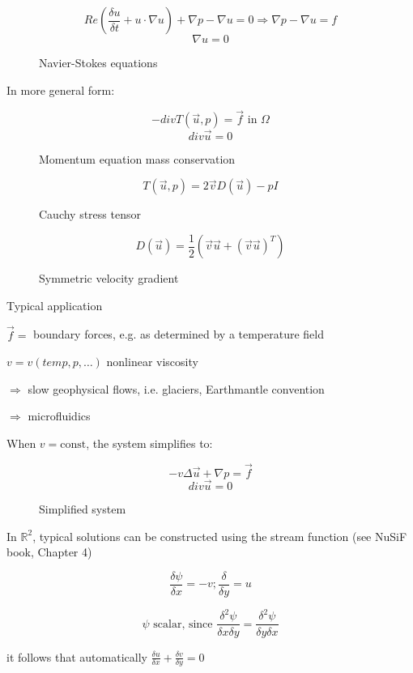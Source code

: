 \documentclass[a4paper,11pt]{scrartcl}
\begin{document}
\begin{figure}[H]
	\centering
	\[ Re( \frac{\delta u}{\delta t} + u \cdot \nabla u) + \nabla p - \nabla u = 0 \Rightarrow \nabla p - \nabla u = f\]
	\[ \nabla u = 0 \]
	\renewcommand{\thefigure}{S0}
	\caption{Navier-Stokes equations}
	\label{fig:stokes-ns}
\end{figure}
 In more general form:
 \begin{figure}[H]
	\centering
	\[ - div T(\vec{u},p) = \vec{f} \text{ in } \Omega \]
	\[ div \vec{u} = 0 \]
	\renewcommand{\thefigure}{S1}
	\caption{Momentum equation mass conservation}
	\label{fig:stokes-mass}
\end{figure}
\begin{figure}[H]
	\centering
	\[ T(\vec{u},p) = 2 \vec{v} D(\vec{u}) - pI \]
	\renewcommand{\thefigure}{S2}
	\caption{Cauchy stress tensor}
	\label{fig:cauchy}
\end{figure}
\begin{figure}[H]
	\centering
	\[ D(\vec{u}) = \frac{1}{2} (\vec{v}\vec{u}+ (\vec{v}\vec{u})^T) \]
	\renewcommand{\thefigure}{S3}
	\caption{Symmetric velocity gradient}
	\label{fig:symm-vel-grad}
\end{figure}

Typical application

$\vec{f} = $ boundary forces, e.g. as determined by a temperature field

$v = v(temp, p, \dots) $ nonlinear viscosity

$\Rightarrow$ slow geophysical flows, i.e. glaciers, Earthmantle convention

$\Rightarrow$ microfluidics

When $v = \text{const}$, the system simplifies to:

\begin{figure}[H]
	\centering
	\[ -v \Delta \vec{u} +  \nabla p = \vec{f}\]
	\[ div \vec{u} = 0\]  %
	\renewcommand{\thefigure}{S4}
	\caption{Simplified system}
	\label{fig:disc-freesplipb}
\end{figure}

In $\mathds{R}^2$, typical solutions can be constructed using the stream function (see NuSiF book, Chapter 4) %
\begin{figure}[H]
	\centering
	\[ \frac{\delta \psi}{\delta x} = -v; \frac{\delta }{\delta y} = u \]
	\renewcommand{\thefigure}{S5}
	\caption{}
	\label{fig:disc-freesplipb}
\end{figure}
\begin{figure}[H]
	\centering
	\[ \psi \text{ scalar, since } \frac{\delta ^2 \psi}{\delta x \delta y} = \frac{\delta^2 \psi}{\delta y \delta x}\]
	\renewcommand{\thefigure}{S6}
	\caption{}
	\label{fig:disc-freesplipb}
\end{figure}
it follows that automatically $\frac{\delta u}{\delta x} + \frac{\delta v}{\delta y} = 0$
\end{document}
